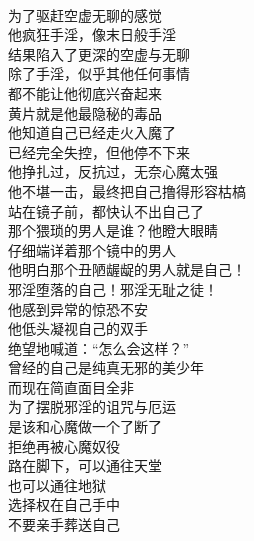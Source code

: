 \begin{poem}[告别手淫洪荒岁月]
    \begin{multicols}{2}
        \begin{center}~\\
            为了驱赶空虚无聊的感觉 \\ 他疯狂手淫，像末日般手淫 \\ 结果陷入了更深的空虚与无聊 \\ 除了手淫，似乎其他任何事情 \\ 都不能让他彻底兴奋起来 \\ 黄片就是他最隐秘的毒品 \\ 他知道自己已经走火入魔了 \\ 已经完全失控，但他停不下来 \\ 他挣扎过，反抗过，无奈心魔太强 \\ 他不堪一击，最终把自己撸得形容枯槁 \\ 站在镜子前，都快认不出自己了 \\ 那个猥琐的男人是谁？他瞪大眼睛 \\ 仔细端详着那个镜中的男人 \\ 他明白那个丑陋龌龊的男人就是自己！ \\ 邪淫堕落的自己！邪淫无耻之徒！ \\ 他感到异常的惊恐不安 \\ 他低头凝视自己的双手 \\ 绝望地喊道：“怎么会这样？” \\ 曾经的自己是纯真无邪的美少年 \\ 而现在简直面目全非 \\ 为了摆脱邪淫的诅咒与厄运 \\ 是该和心魔做一个了断了 \\ 拒绝再被心魔奴役 \\ 路在脚下，可以通往天堂 \\ 也可以通往地狱 \\ 选择权在自己手中 \\ 不要亲手葬送自己
        \end{center}
    \end{multicols}
\end{poem}

